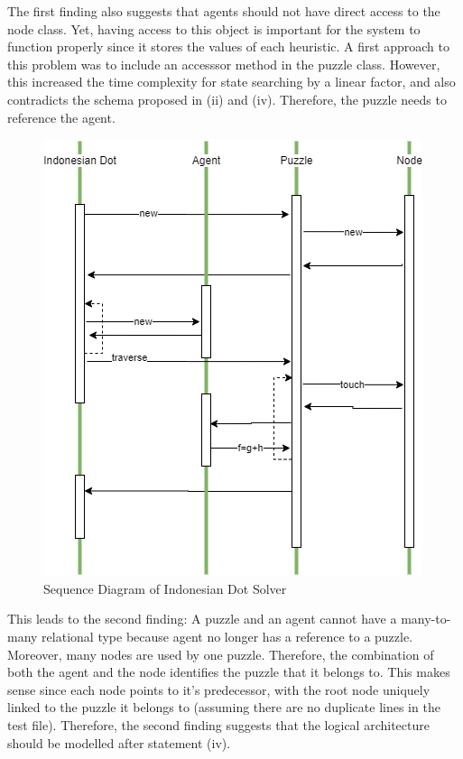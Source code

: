 The first finding also suggests that agents should not have direct access to the node class. Yet, having access to this object is important for the system to function properly since it stores the values of each heuristic. A first approach to this problem was to include an accesssor method in the puzzle class. However, this increased the time complexity for state searching by a linear factor, and also contradicts the schema proposed in (ii) and (iv). Therefore, the puzzle needs to reference the agent.\\

\begin{figure}[H]
\includegraphics[width=0.75\linewidth]{assets/functional.png}
\caption{Sequence Diagram of Indonesian Dot Solver} \label{fig1}
\end{figure}

This leads to the second finding: A puzzle and an agent cannot have a many-to-many relational type because agent no longer has a reference to a puzzle. Moreover, many nodes are used by one puzzle. Therefore, the combination of both the agent and the node identifies the puzzle that it belongs to. This makes sense since each node points to it's predecessor, with the root node uniquely linked to the puzzle it belongs to (assuming there are no duplicate lines in the test file). Therefore, the second finding suggests that the logical architecture should be modelled after statement (iv).\\

